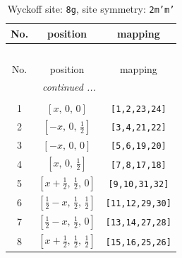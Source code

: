 \documentclass[fleqn,8pt]{jsarticle}
\begin{document}
\begin{longtable}{ccc}
\caption{Wyckoff site: {\tt 8g}, site symmetry: {\tt 2m'm'}}
 \\
 \hline \hline
No. & position & mapping \\ \hline \endfirsthead

\multicolumn{2}{l}{\tablename\ \thetable{}} \\
 \hline \hline
No. & position & mapping \\ \hline \endhead

 \hline \hline
\multicolumn{2}{r}{\footnotesize\it continued ...} \\ \endfoot

 \hline \hline
\multicolumn{2}{r}{} \\ \endlastfoot

1 & $\left[ x,\, 0,\, 0 \right]$ & {\tt [1,2,23,24]} \\ \hline
2 & $\left[ - x,\, 0,\, \frac{1}{2} \right]$ & {\tt [3,4,21,22]} \\ \hline
3 & $\left[ - x,\, 0,\, 0 \right]$ & {\tt [5,6,19,20]} \\ \hline
4 & $\left[ x,\, 0,\, \frac{1}{2} \right]$ & {\tt [7,8,17,18]} \\ \hline
5 & $\left[ x + \frac{1}{2},\, \frac{1}{2},\, 0 \right]$ & {\tt [9,10,31,32]} \\ \hline
6 & $\left[ \frac{1}{2} - x,\, \frac{1}{2},\, \frac{1}{2} \right]$ & {\tt [11,12,29,30]} \\ \hline
7 & $\left[ \frac{1}{2} - x,\, \frac{1}{2},\, 0 \right]$ & {\tt [13,14,27,28]} \\ \hline
8 & $\left[ x + \frac{1}{2},\, \frac{1}{2},\, \frac{1}{2} \right]$ & {\tt [15,16,25,26]} \\
\end{longtable}
\renewcommand{\arraystretch}{1.2}
\end{document}
